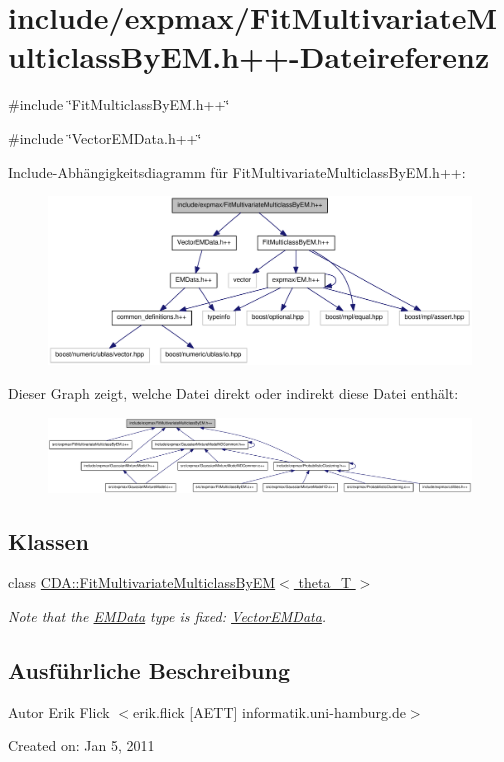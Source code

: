 \hypertarget{FitMultivariateMulticlassByEM_8h_09_09}{
\section{include/expmax/FitMultivariateMulticlassByEM.h++-\/Dateireferenz}
\label{FitMultivariateMulticlassByEM_8h_09_09}
}
{\ttfamily \#include \char`\"{}FitMulticlassByEM.h++\char`\"{}}\par
{\ttfamily \#include \char`\"{}VectorEMData.h++\char`\"{}}\par
Include-\/Abhängigkeitsdiagramm für FitMultivariateMulticlassByEM.h++:\nopagebreak
\begin{figure}[H]
\begin{center}
\leavevmode
\includegraphics[width=345pt]{FitMultivariateMulticlassByEM_8h_09_09__incl}
\end{center}
\end{figure}
Dieser Graph zeigt, welche Datei direkt oder indirekt diese Datei enthält:\nopagebreak
\begin{figure}[H]
\begin{center}
\leavevmode
\includegraphics[width=420pt]{FitMultivariateMulticlassByEM_8h_09_09__dep__incl}
\end{center}
\end{figure}
\subsection*{Klassen}
\begin{DoxyCompactItemize}
\item 
class \hyperlink{classCDA_1_1FitMultivariateMulticlassByEM}{CDA::FitMultivariateMulticlassByEM$<$ theta\_\-T $>$}
\begin{DoxyCompactList}\small\item\em Note that the \hyperlink{classCDA_1_1EMData}{EMData} type is fixed: \hyperlink{classCDA_1_1VectorEMData}{VectorEMData}. \item\end{DoxyCompactList}\end{DoxyCompactItemize}


\subsection{Ausführliche Beschreibung}
\begin{DoxyAuthor}{Autor}
Erik Flick $<$erik.flick \mbox{[}AETT\mbox{]} informatik.uni-\/hamburg.de$>$
\end{DoxyAuthor}
Created on: Jan 5, 2011 